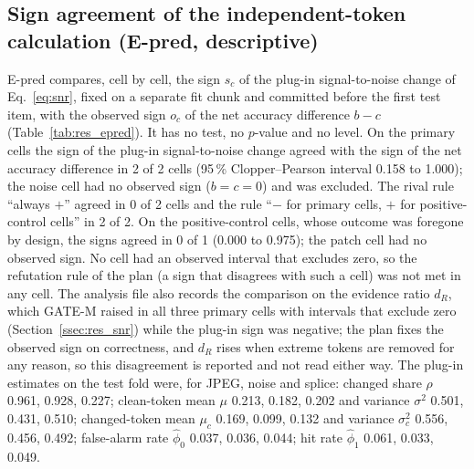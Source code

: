 \subsection{Sign agreement of the independent-token calculation (E-pred, descriptive)}\label{ssec:res_epred}
E-pred compares, cell by cell, the sign $s_c$ of the plug-in signal-to-noise change of Eq.~\eqref{eq:snr}, fixed on a separate fit chunk
and committed before the first test item, with the observed sign $o_c$ of the net accuracy difference $b-c$ (Table~\ref{tab:res_epred}).
It has no test, no $p$-value and no level.
On the primary cells the sign of the plug-in signal-to-noise change agreed with the sign of the net accuracy difference in 2 of 2 cells
(95\,\% Clopper--Pearson interval 0.158 to 1.000); the noise cell had no observed sign ($b=c=0$) and was excluded.
The rival rule ``always $+$'' agreed in 0 of 2 cells and the rule ``$-$ for primary cells, $+$ for positive-control cells'' in 2 of 2.
On the positive-control cells, whose outcome was foregone by design, the signs agreed in 0 of 1 (0.000 to 0.975); the patch cell had
no observed sign.
No cell had an observed interval that excludes zero, so the refutation rule of the plan (a sign that disagrees with such a cell) was
not met in any cell.
The analysis file also records the comparison on the evidence ratio $d_R$, which GATE-M raised in all three primary cells with
intervals that exclude zero (Section~\ref{ssec:res_snr}) while the plug-in sign was negative; the plan fixes the observed sign on
correctness, and $d_R$ rises when extreme tokens are removed for any reason, so this disagreement is reported and not read either way.
The plug-in estimates on the test fold were, for JPEG, noise and splice: changed share $\rho$ 0.961, 0.928, 0.227; clean-token mean
$\mu$ 0.213, 0.182, 0.202 and variance $\sigma^2$ 0.501, 0.431, 0.510; changed-token mean $\mu_c$ 0.169, 0.099, 0.132 and variance
$\sigma_c^2$ 0.556, 0.456, 0.492; false-alarm rate $\hat\phi_0$ 0.037, 0.036, 0.044; hit rate $\hat\phi_1$ 0.061, 0.033, 0.049.

